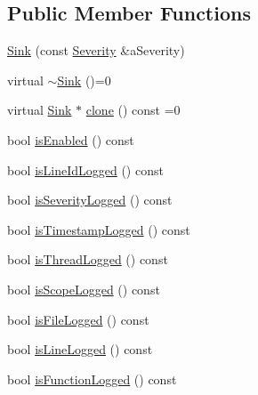 \subsection*{Public Member Functions}
\begin{DoxyCompactItemize}
\item 
\mbox{\hyperlink{classlibrary_1_1core_1_1logger_1_1sinks_1_1_sink_a4d53e570fb2be9c97596289743d0ef9d}{Sink}} (const \mbox{\hyperlink{namespacelibrary_1_1core_1_1logger_a35f71353edf64f68f7fe3874b01abaa8}{Severity}} \&a\+Severity)
\item 
virtual \mbox{\hyperlink{classlibrary_1_1core_1_1logger_1_1sinks_1_1_sink_af00134e95d23ea002acd6dfcc8feed7e}{$\sim$\+Sink}} ()=0
\item 
virtual \mbox{\hyperlink{classlibrary_1_1core_1_1logger_1_1sinks_1_1_sink}{Sink}} $\ast$ \mbox{\hyperlink{classlibrary_1_1core_1_1logger_1_1sinks_1_1_sink_a00ba941947d903825f4922694e0961dd}{clone}} () const =0
\item 
bool \mbox{\hyperlink{classlibrary_1_1core_1_1logger_1_1sinks_1_1_sink_a31a8ad92f76ad05d630d50fe63c1b747}{is\+Enabled}} () const
\item 
bool \mbox{\hyperlink{classlibrary_1_1core_1_1logger_1_1sinks_1_1_sink_a5670a0ee01ffa61fce94ff14b744cda4}{is\+Line\+Id\+Logged}} () const
\item 
bool \mbox{\hyperlink{classlibrary_1_1core_1_1logger_1_1sinks_1_1_sink_af6daeb043af9f1997c04d0e24c12900c}{is\+Severity\+Logged}} () const
\item 
bool \mbox{\hyperlink{classlibrary_1_1core_1_1logger_1_1sinks_1_1_sink_ae9a663485069c6716bb3675d67bd6cd6}{is\+Timestamp\+Logged}} () const
\item 
bool \mbox{\hyperlink{classlibrary_1_1core_1_1logger_1_1sinks_1_1_sink_afdf81adfa6c595d8014b466d86479fae}{is\+Thread\+Logged}} () const
\item 
bool \mbox{\hyperlink{classlibrary_1_1core_1_1logger_1_1sinks_1_1_sink_a09eb7bc8611effd50151c5e371a5962c}{is\+Scope\+Logged}} () const
\item 
bool \mbox{\hyperlink{classlibrary_1_1core_1_1logger_1_1sinks_1_1_sink_a736086840b9c964c40e349d5e7f68cca}{is\+File\+Logged}} () const
\item 
bool \mbox{\hyperlink{classlibrary_1_1core_1_1logger_1_1sinks_1_1_sink_a701bbd71bc5f871ac97abdc98fa4460f}{is\+Line\+Logged}} () const
\item 
bool \mbox{\hyperlink{classlibrary_1_1core_1_1logger_1_1sinks_1_1_sink_a39078847a7c0f6a22893dd82e64545f1}{is\+Function\+Logged}} () const

\end{DoxyCompactItemize}

